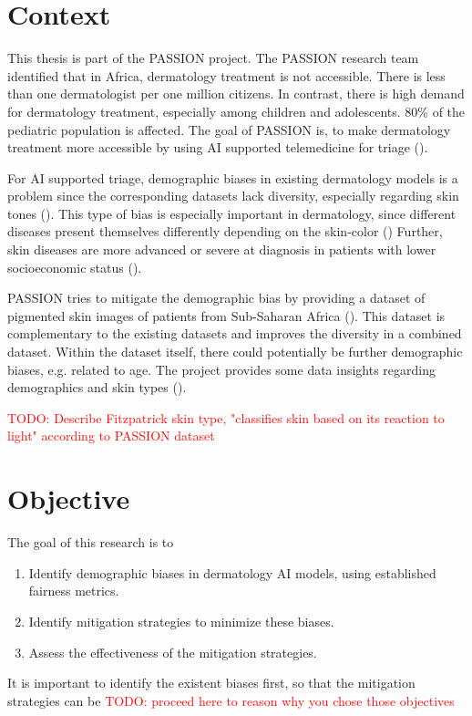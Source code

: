 \documentclass[a4paper,12pt,listof=numbered,toc=chapterentrywithdots]{scrreport}
\renewcommand{\todo}[1]{\textcolor{red}{TODO: #1}}
\begin{document}
		\section{Context}
			This thesis is part of the PASSION project. The PASSION research team identified that in Africa, dermatology treatment is not accessible. There is less than one dermatologist per one million citizens. In contrast, there is high demand for dermatology treatment, especially among children and adolescents. 80\% of the \gls{pediatric} population is affected. The goal of PASSION is, to make dermatology treatment more accessible by using AI supported telemedicine for triage (\cite{Gottfrois2024}).
		
			For AI supported triage, demographic biases in existing dermatology models is a problem since the corresponding datasets lack diversity, especially regarding skin tones (\cite{Gottfrois2024}). This type of bias is especially important in dermatology, since different diseases present themselves differently depending on the skin-color (\cite{Diaz2022}) Further, skin diseases are more advanced or severe at diagnosis in patients with lower socioeconomic status (\cite{BAD2021}).
			
			PASSION tries to mitigate the demographic bias by providing a dataset of pigmented skin images of patients from Sub-Saharan Africa (\cite{Gottfrois2024}). This dataset is complementary to the existing datasets and improves the diversity in a combined dataset. Within the dataset itself, there could potentially be further demographic biases, e.g. related to age. The project provides some data insights regarding demographics and skin types (\cite{Gottfrois2024}).
			 
			 
 			\todo{Describe Fitzpatrick skin type, "classifies skin based on its reaction to light" according to PASSION dataset}
			 
		\section{Objective}
		The goal of this research is to
		\begin{enumerate}
			\item Identify demographic biases in dermatology AI models, using established fairness metrics.
			\item Identify mitigation strategies to minimize these biases.
			\item Assess the effectiveness of the mitigation strategies.
		\end{enumerate}
		It is important to identify the existent biases first, so that the mitigation strategies can be \todo{proceed here to reason why you chose those objectives}
		
\end{document}
